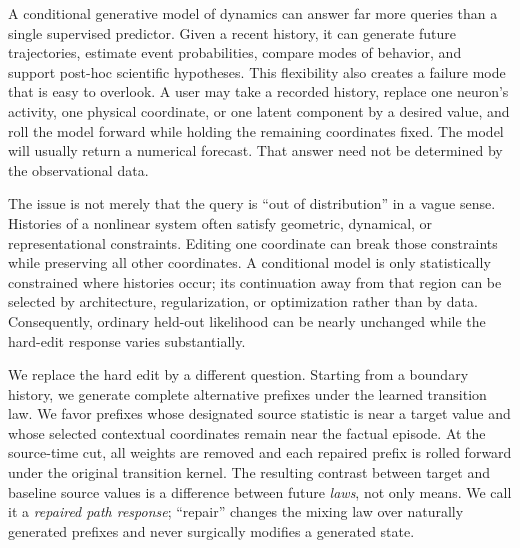 \documentclass{article}
\theoremstyle{remark}
\begin{document}
A conditional generative model of dynamics can answer far more queries than a
single supervised predictor. Given a recent history, it can generate future
trajectories, estimate event probabilities, compare modes of behavior, and
support post-hoc scientific hypotheses. This flexibility also creates a
failure mode that is easy to overlook. A user may take a recorded history,
replace one neuron's activity, one physical coordinate, or one latent
component by a desired value, and roll the model forward while holding the
remaining coordinates fixed. The model will usually return a numerical
forecast. That answer need not be determined by the observational data.

The issue is not merely that the query is ``out of distribution'' in a vague
sense. Histories of a nonlinear system often satisfy geometric, dynamical, or
representational constraints. Editing one coordinate can break those
constraints while preserving all other coordinates. A conditional model is
only statistically constrained where histories occur; its continuation away
from that region can be selected by architecture, regularization, or
optimization rather than by data. Consequently, ordinary held-out likelihood
can be nearly unchanged while the hard-edit response varies substantially.

We replace the hard edit by a different question. Starting from a boundary
history, we generate complete alternative prefixes under the learned
transition law. We favor prefixes whose designated source statistic is near a
target value and whose selected contextual coordinates remain near the factual
episode. At the source-time cut, all weights are removed and each repaired
prefix is rolled forward under the original transition kernel. The resulting
contrast between target and baseline source values is a difference between
future \emph{laws}, not only means. We call it a
\emph{repaired path response}; ``repair'' changes the mixing law over naturally
generated prefixes and never surgically modifies a generated state.
\end{document}
